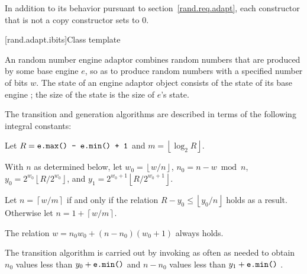 \pnum
In addition to its behavior
pursuant to section~\ref{rand.req.adapt},
each constructor%
that is not a copy constructor
sets  to $0$.


[rand.adapt.ibits]{Class template }%
%

\pnum
An 
random number engine adaptor
combines random numbers
that are produced by some base engine $e$,
so as to produce random numbers
with a specified number of bits $w$.
The state%
%
of an 
engine adaptor object 
consists of
 the state  of its base engine ;
the size of the state is
 the size of $e$'s state.

\pnum
The transition and generation algorithms
are described in terms
of the following integral constants:%
\begin{enumeratea}
 \item
   Let
     $ R = \texttt{\protect e.max() - e.min() + 1} $
   and
     $ m = \left\lfloor \log_2 R \right\rfloor $.
 \item
   With $n$ as determined below,
   let
     $ w_0 = \left\lfloor w / n \right\rfloor $,
     $ n_0 = n - w \bmod n $,
     $ y_0 = 2^{w_0} \left\lfloor R / 2^{w_0} \right\rfloor $,
   and
     $ y_1 = 2^{w_0 + 1} \left\lfloor R / 2^{w_0 + 1} \right\rfloor $.
 \item
   Let
     $ n = \left\lceil w / m \right\rceil $
   if and only if the relation
     $ R - y_0 \leq \left\lfloor y_0 / n \right\rfloor $
   holds as a result.
   Otherwise let
     $ n = 1 + \left\lceil w / m \right\rceil $.
\end{enumeratea}
\begin{note}
 The relation
 $ w = n_0 w_0 + (n - n_0)(w_0 + 1) $
 always holds.
\end{note}

\pnum
The transition algorithm%
%
is carried out
by invoking 
as often as needed
to obtain
 $ n_0 $
values less than
$ y_0 + \texttt{\protect e.min()} $
and
 $ n - n_0 $
values less than $ y_1 + \texttt{\protect e.min()} $%
.


